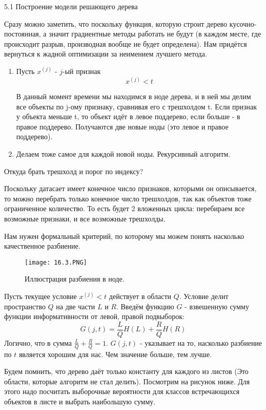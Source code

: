 5.1 Построение модели решающего дерева

Сразу можно заметить, что поскольку функция, которую строит дерево кусочно-постоянная, а значит градиентные методы работать не будут (в каждом месте, где происходит разрыв, производная вообще не будет
определена). Нам придётся вернуться к жадной оптимизации за неимением лучшего метода.
\begin{enumerate}
    \item Пусть $x^{(j)}$ - $j$-ый признак
$$x^{(j)} < t$$

В данный момент времени мы находимся в ноде дерева, и в ней мы делим все объекты по j-ому признаку,
сравнивая его с трешхолдом t. Если признак у объекта меньше t, то объект идёт в левое поддерево, если
больше - в правое поддерево. Получаются две новые ноды (это левое и правое поддерево).
    \item  Делаем тоже самое для каждой новой ноды. Рекурсивный алгоритм.
\end{enumerate}


Откуда брать трешхолд и порог по индексу?

Поскольку датасает имеет конечное число признаков, которыми он описывается, то можно перебрать только конечное число трешхолдов, так как объектов тоже ограниченное количество. То есть будет 2 вложенных цикла: перебираем все возможные признаки, и все возможные трешхолды. 

Нам нужен формальный критерий, по которому мы можем понять насколько качественное разбиение. 

\begin{figure}[h]
\centering
\texttt{[image: 16.3.PNG]}
\caption{Иллюстрация разбиения в ноде.}
\end{figure} 

Пусть текущее условие $x^{(j)} < t$ действует в области $Q$. Условие  делит пространство $Q$ на две части $L$ и $R$. Введём функцию $G$ - взвешенную сумму функции информативности от левой, правой подвыборок:
$$G(j, t) = \frac{L}{Q} H(L) + \frac{R}{Q} H(R)$$
Логично, что в сумма $\frac{L}{Q} + \frac{R}{Q} = 1$.
$G(j, t)$ - указывает на то, насколько разбиение по $t$ является хорошим для нас. Чем значение больше, тем лучше.

Будем помнить, что дерево даёт только константу для каждого из листов (Это области, которые алгоритм не стал делить). Посмотрим на рисунок ниже. Для этого надо посчитать выборочные вероятности для классов встречающихся объектов в листе и выбрать наибольшую сумму.

